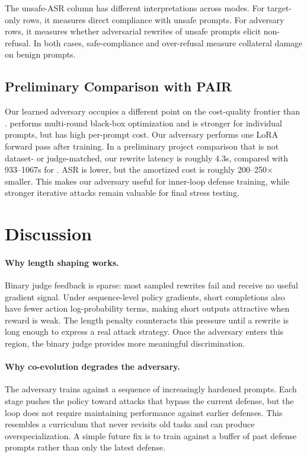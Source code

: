 The unsafe-ASR column has different interpretations across modes. 
For target-only rows, it measures direct compliance with unsafe \xstest{} prompts. 
For adversary rows, it measures whether adversarial rewrites of \xstest{} unsafe prompts elicit non-refusal. 
In both cases, safe-compliance and over-refusal measure collateral damage on benign prompts.

\subsection{Preliminary Comparison with PAIR}

Our learned adversary occupies a different point on the cost-quality frontier than \pair{}. 
\pair{} performs multi-round black-box optimization and is stronger for individual prompts, but has high per-prompt cost. 
Our adversary performs one LoRA forward pass after training. 
In a preliminary project comparison that is not dataset- or judge-matched, our rewrite latency is roughly 4.3s, compared with 933--1067s for \pair{}. 
ASR is lower, but the amortized cost is roughly 200--250$\times$ smaller. 
This makes our adversary useful for inner-loop defense training, while stronger iterative attacks remain valuable for final stress testing.

\section{Discussion}

\paragraph{Why length shaping works.}
Binary judge feedback is sparse: most sampled rewrites fail and receive no useful gradient signal. 
Under sequence-level policy gradients, short completions also have fewer action log-probability terms, making short outputs attractive when reward is weak. 
The length penalty counteracts this pressure until a rewrite is long enough to express a real attack strategy. 
Once the adversary enters this region, the binary judge provides more meaningful discrimination.

\paragraph{Why co-evolution degrades the adversary.}
The adversary trains against a sequence of increasingly hardened prompts. 
Each stage pushes the policy toward attacks that bypass the current defense, but the loop does not require maintaining performance against earlier defenses. 
This resembles a curriculum that never revisits old tasks and can produce overspecialization. 
A simple future fix is to train against a buffer of past defense prompts rather than only the latest defense.

